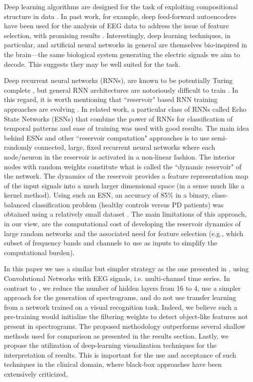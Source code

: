 \documentclass[review]{elsarticle}
\begin{document}
Deep learning algorithms are designed for the task of exploiting compositional structure in data \cite{Poggio2016}. In past work, for example, deep feed-forward autoencoders have been used for the analysis of EEG data to address the issue of feature selection, with promising results \cite{Kroupi2017}. Interestingly, deep learning techniques, in particular, and artificial neural networks in general are themselves bio-inspired in the brain---the same biological system generating the electric signals we aim to decode. This suggests they may be well suited for the task. 

Deep recurrent neural networks (RNNs), are known to be potentially Turing complete \cite{Ruffini:2016ae}, but general RNN architectures are notoriously difficult to train \cite{Goodfellow2016}. In this regard, it is worth mentioning that ``reservoir" based RNN training approaches are evolving \cite{Laje:2013aa}. 
In related work, a particular class of RNNs called Echo State Networks (ESNs) that combine the power of RNNs for classification of temporal patterns and ease of training \cite{Ruffini:2016ad} was used with good results. 
The main idea behind ESNs and other ``reservoir computation" approaches is to use semi-randomly connected, large, fixed recurrent neural networks where each node/neuron in the reservoir is activated in a non-linear fashion. The interior nodes with random weights constitute what is called the ``dynamic reservoir" of the network. 
 The dynamics of the reservoir provides a feature representation map of the input signals into a much larger dimensional space (in a sense much like a kernel method). Using such an ESN, an accuracy of 85\% in a binary, class-balanced classification problem (healthy controls versus PD patients) was obtained using a relatively small dataset \cite{Ruffini:2016ad}. The main limitations of this approach, in our view, are the computational cost of developing the reservoir dynamics of large random networks and the associated need for feature selection (e.g., which subset of frequency bands and channels to use as inputs to simplify the computational burden). 
 
In this paper we use a similar but simpler strategy as the one presented in \cite{Vilamala:2017aa}, using Convolutional Networks with EEG signals, i.e. multi-channel time series. In contrast to \cite{Vilamala:2017aa}, we reduce the number of hidden layers from 16 to 4, use a simpler approach for the generation of spectrograms, and do not use transfer learning from a network trained on a visual recognition task. Indeed, we believe such a pre-training would initialize the filtering weights to detect object-like features not present in spectrograms. The proposed methodology outperforms several shallow methods used for comparison as presented in the results section. Lastly, we propose the utilization of deep-learning visualization techniques for the interpretation of results. This is important for the use and acceptance of such techniques in the clinical domain, where black-box approaches have been extensively criticized, 
 
\end{document}
